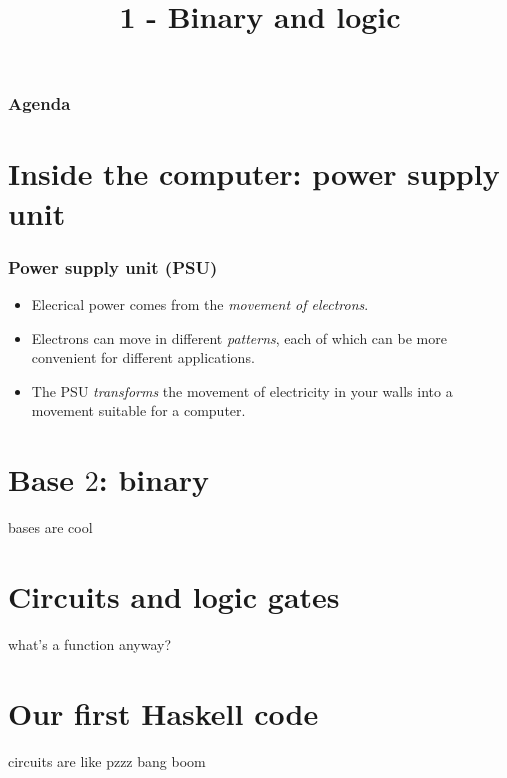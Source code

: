 \documentclass{beamer}
\title{1 - Binary and logic}
\author{}
\date{}
\begin{document}
\frame{\titlepage}

\begin{frame}
  \frametitle{Agenda}
  \tableofcontents
\end{frame}

\section{Inside the computer: power supply unit}

\begin{frame}
  \frametitle{Power supply unit (PSU)}

  \begin{itemize}
    \item Elecrical power comes from the \emph{movement of electrons}.
    \item Electrons can move in different \emph{patterns}, each of which can be
      more convenient for different applications.
    \item The PSU \emph{transforms} the movement of electricity in your walls
      into a movement suitable for a computer.
  \end{itemize}

\end{frame}

\section{Base $2$: binary}

\begin{frame}
  bases are cool
\end{frame}

\section{Circuits and logic gates}

\begin{frame}
  what's a function anyway?
\end{frame}

\section{Our first Haskell code}

\begin{frame}
  circuits are like pzzz bang boom
\end{frame}
\end{document}
